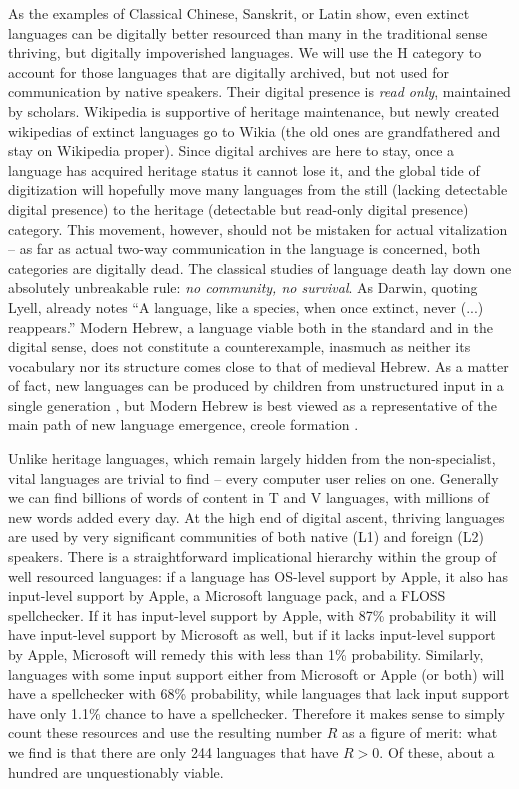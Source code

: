 \documentclass[10pt]{article}
\begin{document}
As the examples of Classical Chinese, Sanskrit, or Latin show, even extinct
languages can be digitally better resourced than many in the traditional sense
thriving, but digitally impoverished languages. We will use the H category to
account for those languages that are digitally archived, but not used for
communication by native speakers. Their digital presence is {\it read only},
maintained by scholars. Wikipedia is supportive of heritage maintenance, but
newly created wikipedias of extinct languages go to Wikia (the old ones are
grandfathered and stay on Wikipedia proper). Since digital archives are here
to stay, once a language has acquired heritage status it cannot lose it, and
the global tide of digitization will hopefully move many languages from the
{\color{black} still} (lacking detectable digital presence) to the heritage
(detectable but read-only digital presence) category. This movement, however,
should not be mistaken for actual vitalization -- as far as actual two-way
communication in the language is concerned, both categories are digitally
dead. The classical studies of language death lay down one absolutely
unbreakable rule: {\it no community, no survival}. As Darwin, quoting Lyell,
already notes ``A language, like a species, when once extinct, never (...)
reappears.''  Modern Hebrew, a language viable both in the standard and in the
digital sense, does not constitute a counterexample, inasmuch as neither its
vocabulary nor its structure comes close to that of medieval Hebrew. As a
matter of fact, new languages can be produced by children from unstructured
input in a single generation \cite{Kegl:1994}\cite{Senghas:2004}, but Modern
Hebrew is best viewed as a representative of the main path of new language
emergence, creole formation \cite{Bickerton:1981}\cite{Izre'el:2003}.

Unlike heritage languages, which remain largely hidden from the
non-specialist, vital languages are trivial to find -- every computer user
relies on one. Generally we can find billions of words of content in T and V
languages, with millions of new words added every day. At the high end of
{\color{black} digital ascent, thriving} languages are used by very significant
communities of both native (L1) and foreign (L2) speakers.  There is a
straightforward implicational hierarchy within the group of well resourced
languages: if a language has OS-level support by Apple, it also has
input-level support by Apple, a Microsoft language pack, and a FLOSS
spellchecker.  If it has input-level support by Apple, with 87\% probability
it will have input-level support by Microsoft as well, but if it lacks
input-level support by Apple, Microsoft will remedy this with less than 1\%
probability. Similarly, languages with some input support either from
Microsoft or Apple (or both) will have a spellchecker with 68\% probability,
while languages that lack input support have only 1.1\% chance to have a
spellchecker. Therefore it makes sense to simply count these resources and use
the resulting number $R$ as a figure of merit: what we find is that there are
only 244 languages that have $R >0$. Of these, about a hundred are
unquestionably viable.
\end{document}
